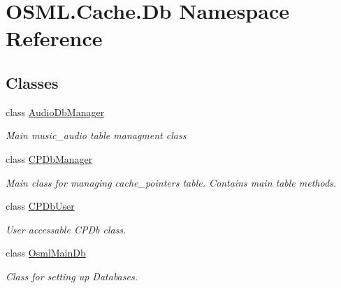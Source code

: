 \hypertarget{namespaceOSML_1_1Cache_1_1Db}{}\section{O\+S\+M\+L.\+Cache.\+Db Namespace Reference}
\label{namespaceOSML_1_1Cache_1_1Db}
\subsection*{Classes}
\begin{DoxyCompactItemize}
\item 
class \mbox{\hyperlink{classOSML_1_1Cache_1_1Db_1_1AudioDbManager}{Audio\+Db\+Manager}}
\begin{DoxyCompactList}\small\item\em Main music\+\_\+audio table managment class \end{DoxyCompactList}\item 
class \mbox{\hyperlink{classOSML_1_1Cache_1_1Db_1_1CPDbManager}{C\+P\+Db\+Manager}}
\begin{DoxyCompactList}\small\item\em Main class for managing cache\+\_\+pointers table. Contains main table methods. \end{DoxyCompactList}\item 
class \mbox{\hyperlink{classOSML_1_1Cache_1_1Db_1_1CPDbUser}{C\+P\+Db\+User}}
\begin{DoxyCompactList}\small\item\em User accessable C\+P\+Db class. \end{DoxyCompactList}\item 
class \mbox{\hyperlink{classOSML_1_1Cache_1_1Db_1_1OsmlMainDb}{Osml\+Main\+Db}}
\begin{DoxyCompactList}\small\item\em Class for setting up Databases. \end{DoxyCompactList}\end{DoxyCompactItemize}
